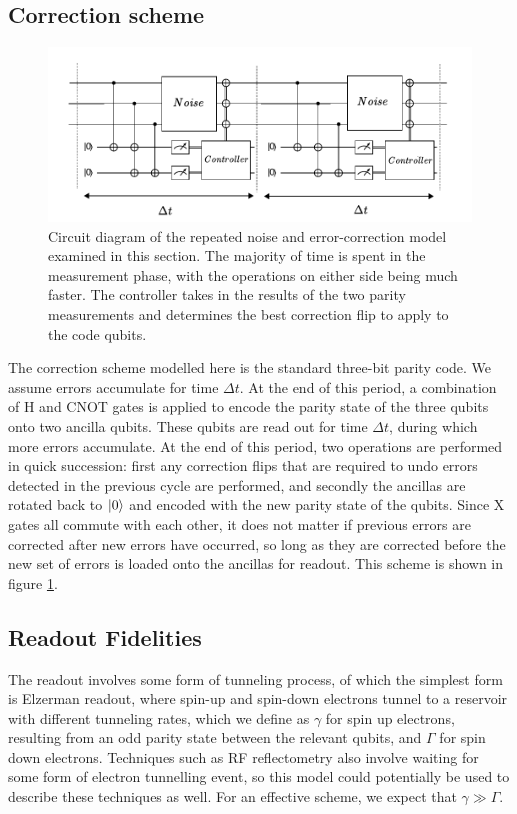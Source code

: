 \documentclass{report}
\begin{document}
\subsection{Correction scheme}
\begin{figure}[ht]
    \centering
    \includegraphics[scale = 0.9]{Figures/Circuit/diagram.pdf}
    \caption{Circuit diagram of the repeated noise and error-correction model examined in this section. The majority of time is spent in the measurement phase, with the operations on either side being much faster. The controller takes in the results of the two parity measurements and determines the best correction flip to apply to the code qubits.}
    \label{fig:circuitdiagram}
\end{figure}
    
The correction scheme modelled here is the standard three-bit parity code. We assume errors accumulate for time $\Delta t$. At the end of this period, a combination of H and CNOT gates is applied to encode the parity state of the three qubits onto two ancilla qubits. These qubits are read out for time $\Delta t$, during which more errors accumulate. At the end of this period, two operations are performed in quick succession: first any correction flips that are required to undo errors detected in the previous cycle are performed, and secondly the ancillas are rotated back to $\ket{0}$ and encoded with the new parity state of the qubits. Since X gates all commute with each other, it does not matter if previous errors are corrected after new errors have occurred, so long as they are corrected before the new set of errors is loaded onto the ancillas for readout. This scheme is shown in figure \ref{fig:circuitdiagram}.

\subsection{Readout Fidelities}
The readout involves some form of tunneling process, of which the simplest form is Elzerman readout, where spin-up and spin-down electrons tunnel to a reservoir with different tunneling rates, which we define as $\gamma$ for spin up electrons, resulting from an odd parity state between the relevant qubits, and $\Gamma$ for spin down electrons. Techniques such as RF reflectometry also involve waiting for some form of electron tunnelling event, so this model could potentially be used to describe these techniques as well. For an effective scheme, we expect that $\gamma \gg \Gamma$.
\end{document}
